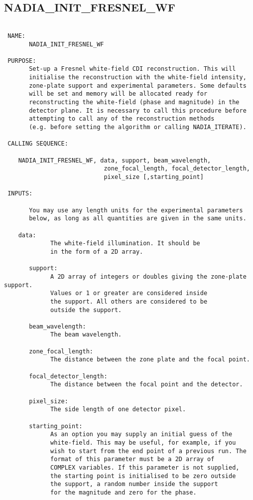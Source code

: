 \subsection{NADIA\_INIT\_FRESNEL\_WF}
\begin{verbatim}

 NAME:
       NADIA_INIT_FRESNEL_WF

 PURPOSE:
       Set-up a Fresnel white-field CDI reconstruction. This will
       initialise the reconstruction with the white-field intensity, 
       zone-plate support and experimental parameters. Some defaults 
       will be set and memory will be allocated ready for 
       reconstructing the white-field (phase and magnitude) in the
       detector plane. It is necessary to call this procedure before
       attempting to call any of the reconstruction methods
       (e.g. before setting the algorithm or calling NADIA_ITERATE).

 CALLING SEQUENCE:

	NADIA_INIT_FRESNEL_WF, data, support, beam_wavelength,
                            zone_focal_length, focal_detector_length,
                            pixel_size [,starting_point]

 INPUTS:

       You may use any length units for the experimental parameters
       below, as long as all quantities are given in the same units.

	data: 
             The white-field illumination. It should be
             in the form of a 2D array.

       support: 
             A 2D array of integers or doubles giving the zone-plate support.
             Values or 1 or greater are considered inside
             the support. All others are considered to be
             outside the support.

       beam_wavelength:
             The beam wavelength.

       zone_focal_length:
             The distance between the zone plate and the focal point.

       focal_detector_length:
             The distance between the focal point and the detector.

       pixel_size:
             The side length of one detector pixel.

       starting_point: 
             As an option you may supply an initial guess of the 
             white-field. This may be useful, for example, if you 
             wish to start from the end point of a previous run. The
             format of this parameter must be a 2D array of
             COMPLEX variables. If this parameter is not supplied,
             the starting point is initialised to be zero outside
             the support, a random number inside the support 
             for the magnitude and zero for the phase.


\end{verbatim}
